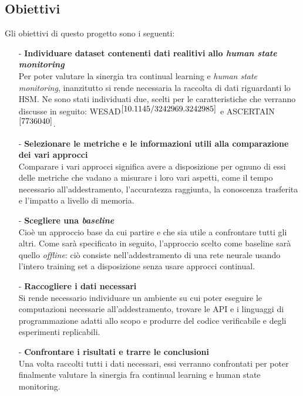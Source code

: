 \subsection{Obiettivi} %
Gli obiettivi di questo progetto sono i seguenti:
\begin{itemize}
    \item[-] \textbf{Individuare dataset contenenti dati realitivi allo \textit{human state monitoring}}\\
    Per poter valutare la sinergia tra continual learning e \textit{human state monitoring}, inanzitutto si rende necessaria la raccolta di dati riguardanti lo HSM. Ne sono stati individuati due, scelti per le caratteristiche che verranno discusse in seguito: WESAD$^{\cite{10.1145/3242969.3242985}}$ e ASCERTAIN$^{\cite{7736040}}$.
    \item[-] \textbf{Selezionare le metriche e le informazioni utili alla comparazione dei vari approcci}\\
    Comparare i vari approcci significa avere a disposizione per ognuno di essi delle metriche che vadano a misurare i loro vari aspetti, come il tempo necessario all'addestramento, l'accuratezza raggiunta, la conoscenza trasferita e l'impatto a livello di memoria.
    \item[-] \textbf{Scegliere una \textit{baseline}}\\
    Cioè un approccio base da cui partire e che sia utile a confrontare tutti gli altri. Come sarà specificato in seguito, l'approccio scelto come baseline sarà quello \textit{offline}: ciò consiste nell'addestramento di una rete neurale usando l'intero training set a disposizione senza usare approcci continual.
    \item[-] \textbf{Raccogliere i dati necessari}\\
    Si rende necessario individuare un ambiente su cui poter eseguire le computazioni necessarie all'addestramento, trovare le API e i linguaggi di programmazione adatti allo scopo e produrre del codice verificabile e degli esperimenti replicabili.
    \item[-] \textbf{Confrontare i risultati e trarre le conclusioni}\\
    Una volta raccolti tutti i dati necessari, essi verranno confrontati per poter finalmente valutare la sinergia fra continual learning e human state monitoring.
\end{itemize}
